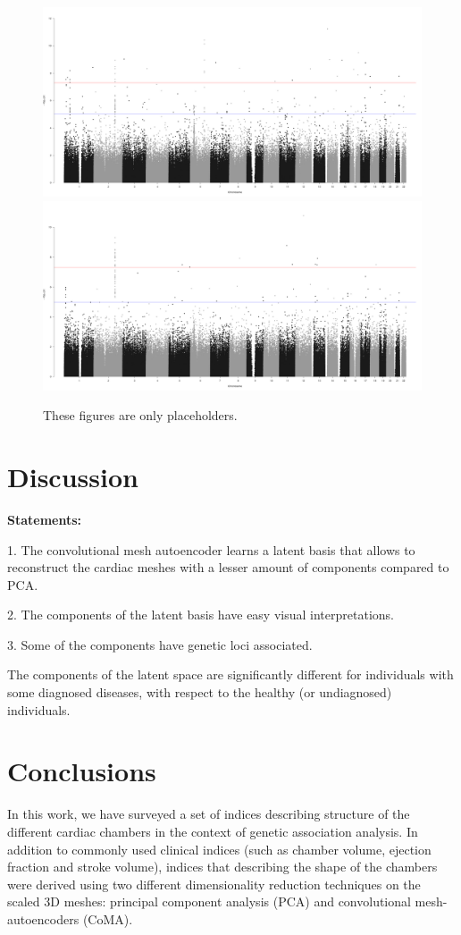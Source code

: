 \documentclass[twocolumn]{llncs}
\begin{document}
\begin{figure}
\includegraphics[width=0.8\linewidth]{figs/manhattan_LVEDV_automatic_adj.png}
\includegraphics[width=0.8\linewidth]{figs/manhattan_LVM_automatic_adj.png}
\caption{These figures are only placeholders.}
\end{figure}


\section{Discussion}

\textbf{Statements:}

1. The convolutional mesh autoencoder learns a latent basis that allows to reconstruct the cardiac meshes with a lesser amount of components compared to PCA.

2. The components of the latent basis have easy visual interpretations.

3. Some of the components have genetic loci associated. 

The components of the latent space are significantly different for individuals with some diagnosed diseases, with respect to the healthy (or undiagnosed) individuals.

\section{Conclusions}

In this work, we have surveyed a set of indices describing structure of the different cardiac chambers in the context of genetic association analysis. In addition to commonly used clinical indices (such as chamber volume, ejection fraction and stroke volume), indices that describing the shape of the chambers were derived using two different dimensionality reduction techniques on the scaled 3D meshes: principal component analysis (PCA) and convolutional mesh-autoencoders (CoMA).
\end{document}

